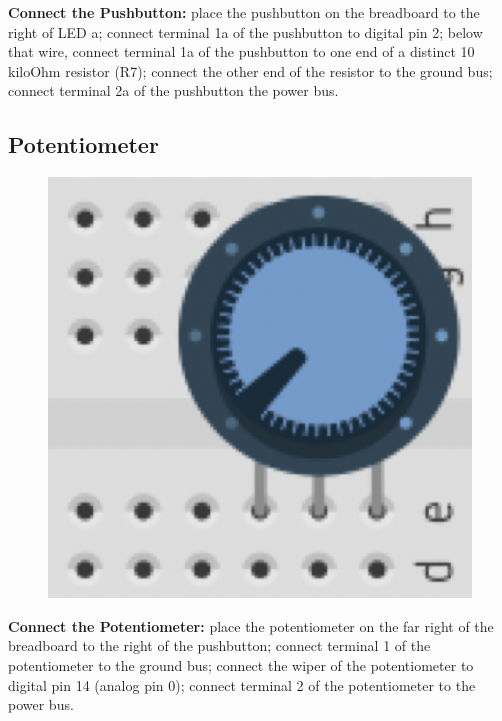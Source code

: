 \documentclass[a4paper]{article}
\begin{document}
\noindent \textbf{Connect the Pushbutton:} place the pushbutton on the breadboard to the right of LED a; connect terminal 1a of the pushbutton to digital pin 2; below that wire, connect terminal 1a of the pushbutton to one end of a distinct 10 kiloOhm resistor (R7); connect the other end of the resistor to the ground bus; connect terminal 2a of the pushbutton the power bus.

\newpage
\subsection{Potentiometer}

\begin{figure}
  \vspace{-35pt}
  \begin{center}
    \includegraphics[width=1.1\linewidth]{potentiometer.png}
  \end{center}
\vspace{-25pt}
\end{figure}

\noindent \textbf{Connect the Potentiometer:} place the potentiometer on the far right of the breadboard to the right of the pushbutton; connect terminal 1 of the potentiometer to the ground bus; connect the wiper of the potentiometer to digital pin 14 (analog pin 0); connect terminal 2 of the potentiometer to the power bus.
\end{document}
